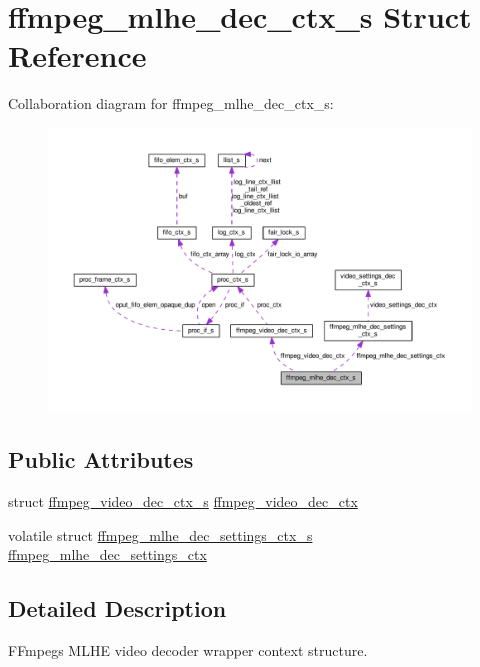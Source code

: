 \hypertarget{structffmpeg__mlhe__dec__ctx__s}{}\section{ffmpeg\+\_\+mlhe\+\_\+dec\+\_\+ctx\+\_\+s Struct Reference}
\label{structffmpeg__mlhe__dec__ctx__s}


Collaboration diagram for ffmpeg\+\_\+mlhe\+\_\+dec\+\_\+ctx\+\_\+s\+:\nopagebreak
\begin{figure}[H]
\begin{center}
\leavevmode
\includegraphics[width=350pt]{structffmpeg__mlhe__dec__ctx__s__coll__graph}
\end{center}
\end{figure}
\subsection*{Public Attributes}
\begin{DoxyCompactItemize}
\item 
struct \hyperlink{structffmpeg__video__dec__ctx__s}{ffmpeg\+\_\+video\+\_\+dec\+\_\+ctx\+\_\+s} \hyperlink{structffmpeg__mlhe__dec__ctx__s_aec4e736f78cfcf59d01cafbc614aaa50}{ffmpeg\+\_\+video\+\_\+dec\+\_\+ctx}
\item 
volatile struct \hyperlink{structffmpeg__mlhe__dec__settings__ctx__s}{ffmpeg\+\_\+mlhe\+\_\+dec\+\_\+settings\+\_\+ctx\+\_\+s} \hyperlink{structffmpeg__mlhe__dec__ctx__s_a80632704c8fc88d0b7ba53e9bb7d2a5e}{ffmpeg\+\_\+mlhe\+\_\+dec\+\_\+settings\+\_\+ctx}
\end{DoxyCompactItemize}


\subsection{Detailed Description}
F\+Fmpeg\textquotesingle{}s M\+L\+HE video decoder wrapper context structure. 

